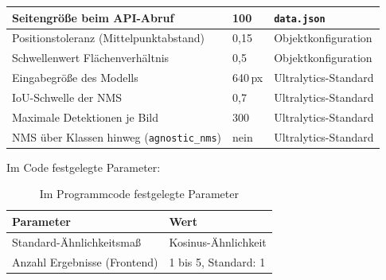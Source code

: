 \begin{table}[H]
\begin{tabularx}{\textwidth}{|X|l|l|}
        Seitengröße beim API-Abruf
            & 100
            & \texttt{data.json} \\
        \hline

        Positionstoleranz (Mittelpunktabstand)
            & 0{,}15
            & Objektkonfiguration \\
        \hline

        Schwellenwert Flächenverhältnis
            & 0{,}5
            & Objektkonfiguration \\
        \hline

        Eingabegröße des Modells
            & 640\,px
            & Ultralytics-Standard \\
        \hline

        IoU-Schwelle der NMS
            & 0{,}7
            & Ultralytics-Standard \\
        \hline

        Maximale Detektionen je Bild
            & 300
            & Ultralytics-Standard \\
        \hline

        NMS über Klassen hinweg (\texttt{agnostic\_nms})
            & nein
            & Ultralytics-Standard \\
        \hline
    \end{tabularx}
\end{table}

Im Code festgelegte Parameter:
\begin{table}[H]
    \centering
    \caption{Im Programmcode festgelegte Parameter}
    \label{tab:codeparameter}

    \begin{tabularx}{\textwidth}{|X|X|}
        \hline
        \textbf{Parameter} &
        \textbf{Wert} \\
        \hline
        Standard-Ähnlichkeitsmaß
            & Kosinus-Ähnlichkeit \\
        \hline

        Anzahl Ergebnisse (Frontend)
            & 1 bis 5, Standard: 1 \\
        \hline
    \end{tabularx}
\end{table}

